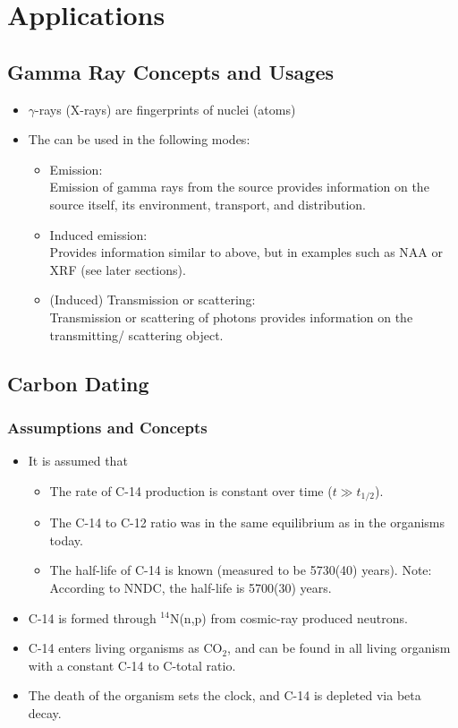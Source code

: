 \section{Applications}
\subsection{Gamma Ray Concepts and Usages}
\begin{itemize}
    \item $\gamma$-rays (X-rays) are fingerprints of nuclei (atoms)
    \item The can be used in the following modes:
    \begin{itemize}
        \item Emission:\\
        Emission of gamma rays from the source provides information on the source itself, its environment, transport, and distribution.
        \item Induced emission:\\
        Provides information similar to above, but in examples such as NAA or XRF (see later sections).
        \item (Induced) Transmission or scattering:\\
        Transmission or scattering of photons provides information on the transmitting/ scattering object.
    \end{itemize}
\end{itemize}
\subsection{Carbon Dating}
\subsubsection{Assumptions and Concepts}
\begin{itemize}
    \item It is assumed that
    \begin{itemize}
        \item The rate of C-14 production is constant over time ($t\gg t_{1/2}$).
        \item The C-14 to C-12 ratio was in the same equilibrium as in the organisms today.
        \item The half-life of C-14 is known (measured to be 5730(40) years). Note: According to NNDC, the half-life is 5700(30) years.
    \end{itemize}
    \item C-14 is formed through $^{14}$N(n,p) from cosmic-ray produced neutrons.
    \item C-14 enters living organisms as CO$_2$, and can be found in all living organism with a constant C-14 to C-total ratio.
    \item The death of the organism sets the clock, and C-14 is depleted via beta decay.
\end{itemize}
